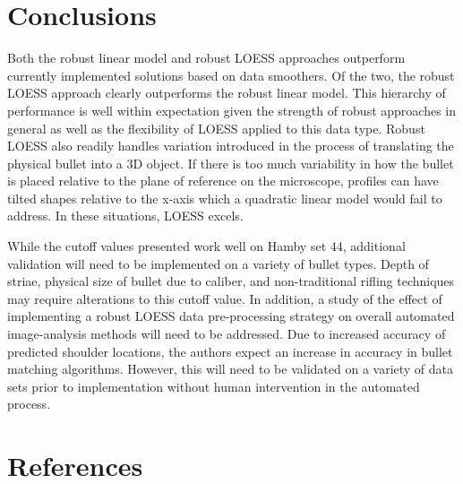\documentclass[]{article}
\begin{document}
\section{Conclusions}

Both the robust linear model and robust LOESS approaches outperform
currently implemented solutions based on data smoothers. Of the two, the
robust LOESS approach clearly outperforms the robust linear model. This
hierarchy of performance is well within expectation given the strength
of robust approaches in general as well as the flexibility of LOESS
applied to this data type. Robust LOESS also readily handles variation
introduced in the process of translating the physical bullet into a 3D
object. If there is too much variability in how the bullet is placed
relative to the plane of reference on the microscope, profiles can have
tilted shapes relative to the x-axis which a quadratic linear model
would fail to address. In these situations, LOESS excels.

While the cutoff values presented work well on Hamby set 44, additional
validation will need to be implemented on a variety of bullet types.
Depth of striae, physical size of bullet due to caliber, and
non-traditional rifling techniques may require alterations to this
cutoff value. In addition, a study of the effect of implementing a
robust LOESS data pre-processing strategy on overall automated
image-analysis methods will need to be addressed. Due to increased
accuracy of predicted shoulder locations, the authors expect an increase
in accuracy in bullet matching algorithms. However, this will need to be
validated on a variety of data sets prior to implementation without
human intervention in the automated process.

\section{References}


\end{document}
